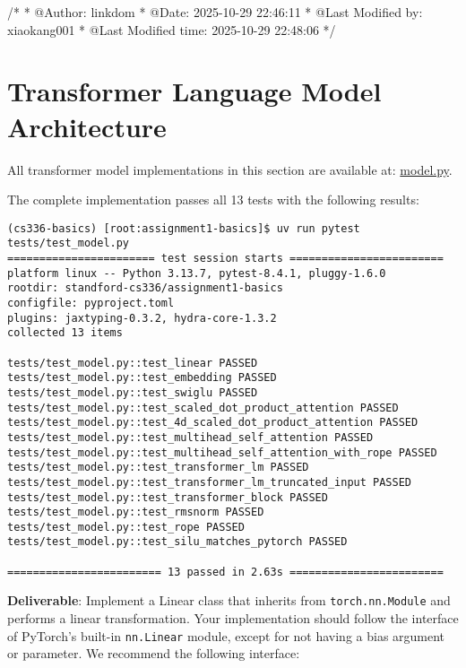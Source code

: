 /*
 * @Author: linkdom 
 * @Date: 2025-10-29 22:46:11 
 * @Last Modified by: xiaokang001
 * @Last Modified time: 2025-10-29 22:48:06
 */
\section{Transformer Language Model Architecture}

All transformer model implementations in this section are available at: \href{https://github.com/donglinkang2021/cs336-assignment1-basics/blob/main/cs336_basics/model.py}{model.py}.

The complete implementation passes all 13 tests with the following results:
\begin{lstlisting}
(cs336-basics) [root:assignment1-basics]$ uv run pytest tests/test_model.py
======================= test session starts ========================
platform linux -- Python 3.13.7, pytest-8.4.1, pluggy-1.6.0
rootdir: standford-cs336/assignment1-basics
configfile: pyproject.toml
plugins: jaxtyping-0.3.2, hydra-core-1.3.2
collected 13 items                                                 

tests/test_model.py::test_linear PASSED
tests/test_model.py::test_embedding PASSED
tests/test_model.py::test_swiglu PASSED
tests/test_model.py::test_scaled_dot_product_attention PASSED
tests/test_model.py::test_4d_scaled_dot_product_attention PASSED
tests/test_model.py::test_multihead_self_attention PASSED
tests/test_model.py::test_multihead_self_attention_with_rope PASSED
tests/test_model.py::test_transformer_lm PASSED
tests/test_model.py::test_transformer_lm_truncated_input PASSED
tests/test_model.py::test_transformer_block PASSED
tests/test_model.py::test_rmsnorm PASSED
tests/test_model.py::test_rope PASSED
tests/test_model.py::test_silu_matches_pytorch PASSED

======================== 13 passed in 2.63s ========================
\end{lstlisting}


\textbf{Deliverable}: Implement a Linear class that inherits from \lstinline{torch.nn.Module} and performs a linear transformation. Your implementation should follow the interface of PyTorch's built-in \lstinline{nn.Linear} module, except for not having a bias argument or parameter. We recommend the following interface:

